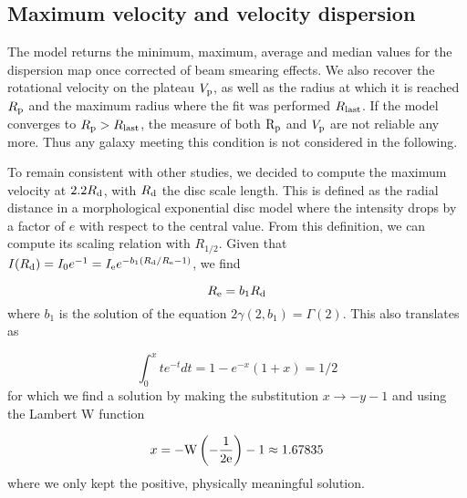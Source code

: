 \subsection{Maximum velocity and velocity dispersion}

The model returns the minimum, maximum, average and median values for the dispersion map once corrected of beam smearing effects. We also recover the rotational velocity on the plateau $V_{\rm{p}}$, as well as the radius at which it is reached $R_{\rm{p}}$ and the maximum radius where the fit was performed $R_{\rm{last}}$. If the model converges to $R_{\rm{p}} > R_{\rm{last}}$, the measure of both $\rm{R_p}$ and $V_{\rm{p}}$ are not reliable any more. Thus any galaxy meeting this condition is not considered in the following.

To remain consistent with other studies, we decided to compute the maximum velocity at $2.2 R_{\rm{d}}$, with $R_{\rm{d}}$ the disc scale length. This is defined as the radial distance in a morphological exponential disc model where the intensity drops by a factor of $e$ with respect to the central value. From this definition, we can compute its scaling relation with $R_{1/2}$. Given that $I(R_{\rm{d}}) = I_0 e^{-1} = I_{\rm{e}} e^{- b_1 ( R_{\rm{d}} / R_{\rm{e}} - 1 )}$, we find

\begin{equation}
	R_{\rm{e}} = b_1 R_{\rm{d}}
\end{equation}
where $b_1$ is the solution of the equation $2 \gamma (2, b_1) = \Gamma(2)$. This also translates as

\begin{equation}
	\int_0^x t e^{-t} dt = 1 - e^{-x} ( 1 + x) = 1/2
\end{equation}
for which we find a solution by making the substitution $x \rightarrow - y - 1$ and using the Lambert W function

\begin{equation}
	x = - \rm{W} \left ( - \frac{1}{2 e} \right ) - 1 \approx 1.67835
\end{equation}
where we only kept the positive, physically meaningful solution. 
